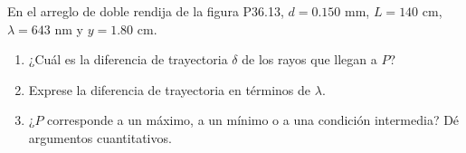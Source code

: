 \item En el arreglo de doble rendija de la figura P36.13, $d = 0.150\text{ mm}$, $L = 140\text{ cm}$, $\lambda = 643\text{ nm}$ y $y = 1.80\text{ cm}$.
\begin{enumerate}
    \item ¿Cuál es la diferencia de trayectoria $\delta$ de los rayos que llegan a $P$?
    \item Exprese la diferencia de trayectoria en términos de $\lambda$.
    \item ¿$P$ corresponde a un máximo, a un mínimo o a una condición intermedia? Dé argumentos cuantitativos.
\end{enumerate}